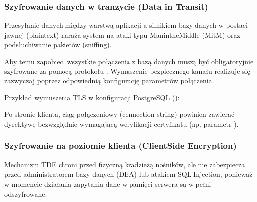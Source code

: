 \documentclass[a4paper,11pt,english,openany,oneside]{sphinxmanual}
\begin{document}
\subsubsection{Szyfrowanie danych w tranzycie (Data in Transit)}
\label{\detokenize{rozdzial_2/rozdzial_27/rozdzial_4:szyfrowanie-danych-w-tranzycie-data-in-transit}}
\sphinxAtStartPar
Przesyłanie danych między warstwą aplikacji a silnikiem bazy danych w postaci jawnej (plaintext) naraża system na ataki typu Man\sphinxhyphen{}in\sphinxhyphen{}the\sphinxhyphen{}Middle (MitM) oraz podsłuchiwanie pakietów (sniffing).

\sphinxAtStartPar
Aby temu zapobiec, wszystkie połączenia z bazą danych muszą być obligatoryjnie szyfrowane za pomocą protokołu . Wymuszenie bezpiecznego kanału realizuje się zazwyczaj poprzez odpowiednią konfigurację parametrów połączenia.

\sphinxAtStartPar
Przykład wymuszenia TLS w konfiguracji PostgreSQL ():

\begin{sphinxVerbatim}[commandchars=\\\{\}]
\end{sphinxVerbatim}

\sphinxAtStartPar
Po stronie klienta, ciąg połączeniowy (connection string) powinien zawierać dyrektywę bezwzględnie wymagającą weryfikacji certyfikatu (np. parametr ).


\subsubsection{Szyfrowanie na poziomie klienta (Client\sphinxhyphen{}Side Encryption)}
\label{\detokenize{rozdzial_2/rozdzial_27/rozdzial_4:szyfrowanie-na-poziomie-klienta-client-side-encryption}}
\sphinxAtStartPar
Mechanizm TDE chroni przed fizyczną kradzieżą nośników, ale nie zabezpiecza przed administratorem bazy danych (DBA) lub atakiem SQL Injection, ponieważ w momencie działania zapytania dane w pamięci serwera są w pełni odszyfrowane.
\end{document}
